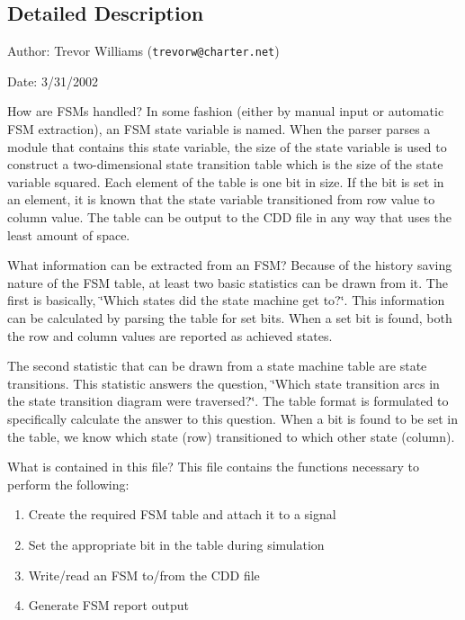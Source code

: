 \subsection{Detailed Description}
\begin{Desc}
\item[Author:]Trevor Williams ({\tt trevorw@charter.net}) \end{Desc}
\begin{Desc}
\item[Date:]3/31/2002\end{Desc}
\begin{Desc}
\item[How are FSMs handled?]In some fashion (either by manual input or automatic FSM extraction), an FSM state variable is named. When the parser parses a module that contains this state variable, the size of the state variable is used to construct a two-dimensional state transition table which is the size of the state variable squared. Each element of the table is one bit in size. If the bit is set in an element, it is known that the state variable transitioned from row value to column value. The table can be output to the CDD file in any way that uses the least amount of space.\end{Desc}
\begin{Desc}
\item[What information can be extracted from an FSM?]Because of the history saving nature of the FSM table, at least two basic statistics can be drawn from it. The first is basically, \char`\"{}Which states did the state machine get to?\char`\"{}. This information can be calculated by parsing the table for set bits. When a set bit is found, both the row and column values are reported as achieved states.\end{Desc}
\begin{Desc}
\item[]The second statistic that can be drawn from a state machine table are state transitions. This statistic answers the question, \char`\"{}Which state transition arcs in the state transition diagram were traversed?\char`\"{}. The table format is formulated to specifically calculate the answer to this question. When a bit is found to be set in the table, we know which state (row) transitioned to which other state (column).\end{Desc}
\begin{Desc}
\item[What is contained in this file?]This file contains the functions necessary to perform the following:\begin{enumerate}
\item Create the required FSM table and attach it to a signal\item Set the appropriate bit in the table during simulation\item Write/read an FSM to/from the CDD file\item Generate FSM report output\end{enumerate}
\end{Desc}


